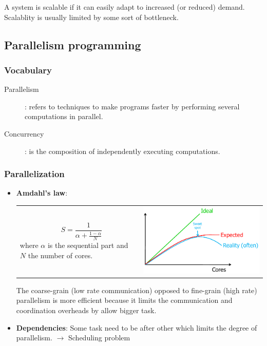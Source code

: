 
A system is scalable if it can easily adapt to 
increased (or reduced) demand. Scalablity
is usually limited by some sort of bottleneck.

\subsection{Parallelism programming}

\subsubsection{Vocabulary}
\begin{description}
    \item[Parallelism]: refers to techniques to make programs faster by
        performing several computations in parallel.

    \item[Concurrency]: is the composition of independently executing
        computations.

\end{description}

\subsubsection{Parallelization}
\begin{itemize}
    \item \textbf{Amdahl's law}:

        \begin{tabular}{m{0.5\linewidth}m{0.5\linewidth}}
            $$\quad S = \frac{1}{\alpha +
            \frac{1-\alpha}{N}}$$ where $\alpha$ is the sequential part and $N$ the
            number of cores.
            &
            \includegraphics[width=6cm]{img/amdahl.png}
        \end{tabular}

        The coarse-grain (low rate communication) opposed to fine-grain (high rate) 
        parallelism is more efficient because it limits the communication and 
        coordination overheads by allow bigger task.

    \item \textbf{Dependencies}: Some task need to be after other which limits the degree of 
        parallelism. $\rightarrow$ Scheduling problem
\end{itemize}

